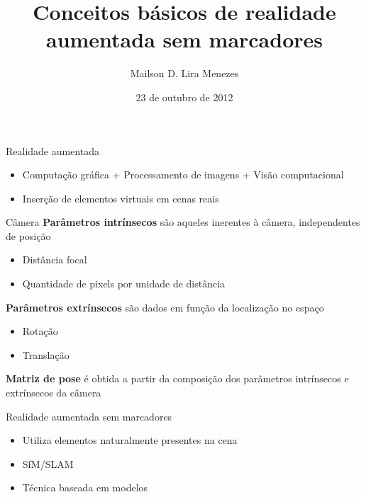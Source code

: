 \documentclass{beamer}
\title{Conceitos básicos de realidade aumentada sem marcadores}
\author{Mailson D. Lira Menezes}
\institute{Universidade Federal de Pernambuco}
\date{23 de outubro de 2012}
\begin{document}
\begin{frame}
\titlepage
\end{frame}

\begin{frame}
    Realidade aumentada
    \begin{itemize}
        \item Computação gráfica + Processamento de imagens + Visão computacional
        \item Inserção de elementos virtuais em cenas reais
    \end{itemize}
\end{frame}


\begin{frame}{Câmera}
    \textbf{Parâmetros intrínsecos} são aqueles inerentes à câmera, independentes de posição\\
    \begin{itemize}
        \item Distância focal
        \item Quantidade de pixels por unidade de distância
    \end{itemize}
    \textbf{Parâmetros extrínsecos} são dados em função da localização no espaço\\
    \begin{itemize}
        \item Rotação
        \item Translação
    \end{itemize}
\end{frame}

\begin{frame}
    \textbf{Matriz de pose} é obtida a partir da composição dos parâmetros intrínsecos e extrínsecos da câmera
\end{frame}

\begin{frame}
    Realidade aumentada sem marcadores
    \begin{itemize}
        \item Utiliza elementos naturalmente presentes na cena
        \item SfM/SLAM
        \item Técnica baseada em modelos
    \end{itemize}
\end{frame}
\end{document}
